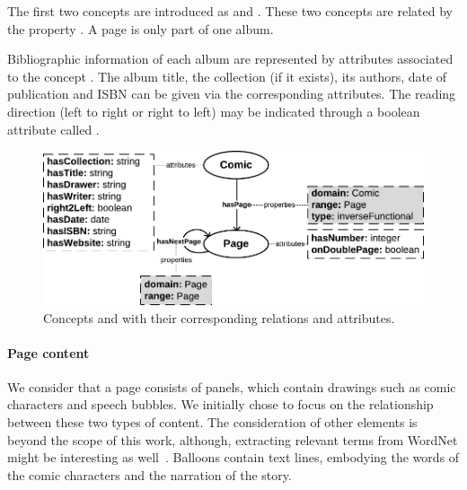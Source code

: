 The first two concepts are introduced as  and .
These two concepts are related by the property .
A page is only part of one album.

Bibliographic information of each album are represented by attributes associated to the concept .
The album title, the collection (if it exists), its authors, date of publication and ISBN can be given via the corresponding attributes.
The reading direction (left to right or right to left) may be indicated through a boolean attribute called .

\begin{figure}[h!]
\begin{center}
\includegraphics[width=1\textwidth]{model_step1.pdf}
\caption[Initial comics model]{Concepts  and  with their corresponding relations and attributes.}
\label{fig:model_d_1}
\end{center}
\end{figure}

\paragraph{Page content} %
\label{par:page_content}

We consider that a page consists of panels, which contain drawings such as comic characters and speech bubbles.
We initially chose to focus on the relationship between these two types of content.
The consideration of other elements is beyond the scope of this work, although, extracting relevant terms from WordNet might be interesting as well~\cite{Zinger05extracting}.
Balloons contain text lines, embodying the words of the comic characters and the narration of the story.

